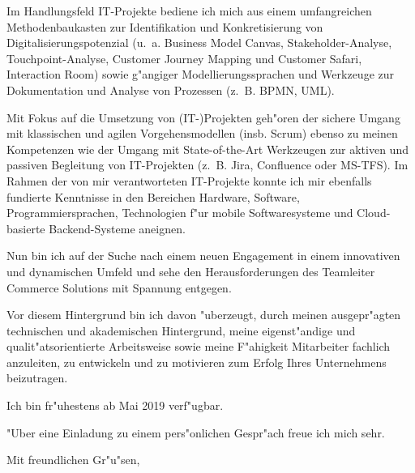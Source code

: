\documentclass[10pt,a4paper]{dinbrief}
\begin{document}
\begin{letter}
Im Handlungsfeld IT-Projekte bediene ich mich aus einem umfangreichen Methodenbaukasten zur Identifikation und Konkretisierung von Digitalisierungspotenzial (u.~a. Business Model Canvas, Stakeholder-Analyse, Touchpoint-Analyse, Customer Journey Mapping und Customer Safari, Interaction Room) sowie g"angiger Modellierungssprachen und Werkzeuge zur Dokumentation und Analyse von Prozessen (z.~B. BPMN, UML).\clearpage

Mit Fokus auf die Umsetzung von (IT-)Projekten geh"oren der sichere Umgang mit klassischen und agilen Vorgehensmodellen (insb. Scrum) ebenso zu meinen Kompetenzen wie der Umgang mit State-of-the-Art Werkzeugen zur aktiven und passiven Begleitung von IT-Projekten (z.~B. Jira, Confluence oder MS-TFS). Im Rahmen der von mir verantworteten IT-Projekte konnte ich mir ebenfalls fundierte Kenntnisse in den Bereichen Hardware, Software, Programmiersprachen, Technologien f"ur mobile Softwaresysteme und Cloud-basierte Backend-Systeme aneignen.

Nun bin ich auf der Suche nach einem neuen Engagement in einem innovativen und dynamischen Umfeld und sehe den Herausforderungen des Teamleiter Commerce Solutions mit Spannung entgegen.

Vor diesem Hintergrund bin ich davon "uberzeugt, durch meinen ausgepr"agten technischen und akademischen Hintergrund, meine eigenst"andige und qualit"atsorientierte Arbeitsweise sowie meine F"ahigkeit Mitarbeiter fachlich anzuleiten, zu entwickeln und zu motivieren zum Erfolg Ihres Unternehmens beizutragen.

Ich bin fr"uhestens ab Mai 2019 verf"ugbar. %

"Uber eine Einladung zu einem pers"onlichen Gespr"ach freue ich mich sehr.

\closing{Mit freundlichen Gr"u"sen,}
\end{letter}
\end{document}
